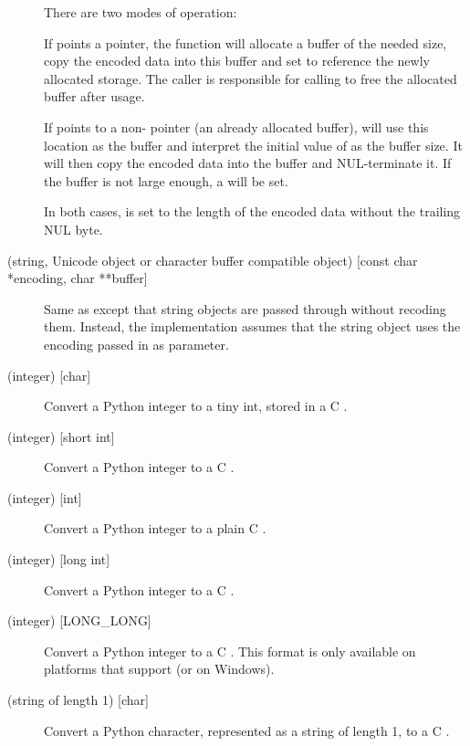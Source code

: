\begin{description}
  There are two modes of operation:

  If  points a \NULL{} pointer, the function will
  allocate a buffer of the needed size, copy the encoded data into
  this buffer and set  to reference the newly allocated
  storage.  The caller is responsible for calling
   to free the allocated buffer after usage.

  If  points to a non-\NULL{} pointer (an already
  allocated buffer),  will use this
  location as the buffer and interpret the initial value of
   as the buffer size.  It will then copy the
  encoded data into the buffer and NUL-terminate it.  If the buffer
  is not large enough, a  will be set.

  In both cases,  is set to the length of the
  encoded data without the trailing NUL byte.

  \item[\samp{et\#} (string, Unicode object or character buffer compatible
  object) {[const char *encoding, char **buffer]}]
  Same as  except that string objects are passed through
  without recoding them. Instead, the implementation assumes that the
  string object uses the encoding passed in as parameter.

  \item[\samp{b} (integer) {[char]}]
  Convert a Python integer to a tiny int, stored in a C .

  \item[\samp{h} (integer) {[short int]}]
  Convert a Python integer to a C .

  \item[\samp{i} (integer) {[int]}]
  Convert a Python integer to a plain C .

  \item[\samp{l} (integer) {[long int]}]
  Convert a Python integer to a C .

  \item[\samp{L} (integer) {[LONG_LONG]}]
  Convert a Python integer to a C .  This format is
  only available on platforms that support  (or
   on Windows).

  \item[\samp{c} (string of length 1) {[char]}]
  Convert a Python character, represented as a string of length 1, to
  a C .


\end{description}
